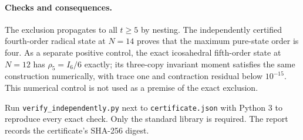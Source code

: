 \documentclass[11pt]{article}
\begin{document}
\paragraph{Checks and consequences.}
The exclusion propagates to all $t\ge5$ by nesting. The independently
certified fourth-order radical state at $N=14$ proves that the maximum
pure-state order is four. As a separate positive control, the exact
icosahedral fifth-order state at $N=12$ has $\rho_5=I_6/6$ exactly;
its three-copy invariant moment satisfies the same construction
numerically, with trace one and contraction residual below $10^{-15}$.
This numerical control is not used as a premise of the exact exclusion.

Run \texttt{verify\_independently.py} next to \texttt{certificate.json}
with Python 3 to reproduce every exact check. Only the standard library
is required. The report records the certificate's SHA-256 digest.
\end{document}
